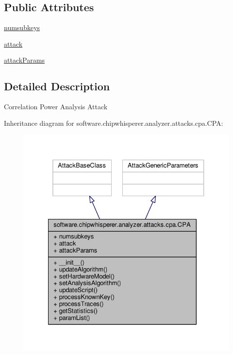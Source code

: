 \subsection*{Public Attributes}
\begin{DoxyCompactItemize}
\item 
\hyperlink{classsoftware_1_1chipwhisperer_1_1analyzer_1_1attacks_1_1cpa_1_1CPA_a3277c248828abebda2823699d99bae32}{numsubkeys}
\item 
\hyperlink{classsoftware_1_1chipwhisperer_1_1analyzer_1_1attacks_1_1cpa_1_1CPA_a587c513e5f4f4eab10995d628c2db277}{attack}
\item 
\hyperlink{classsoftware_1_1chipwhisperer_1_1analyzer_1_1attacks_1_1cpa_1_1CPA_a60f3ed82aa38f86c5ea30733bb3316a7}{attack\+Params}
\end{DoxyCompactItemize}


\subsection{Detailed Description}
\begin{DoxyVerb}Correlation Power Analysis Attack\end{DoxyVerb}
 

Inheritance diagram for software.\+chipwhisperer.\+analyzer.\+attacks.\+cpa.\+C\+P\+A\+:\nopagebreak
\begin{figure}[H]
\begin{center}
\leavevmode
\includegraphics[width=327pt]{d2/d05/classsoftware_1_1chipwhisperer_1_1analyzer_1_1attacks_1_1cpa_1_1CPA__inherit__graph}
\end{center}
\end{figure}



